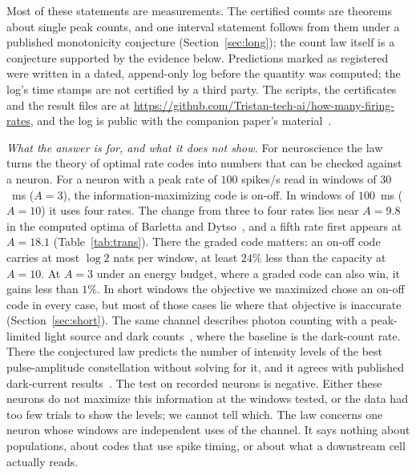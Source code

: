 \documentclass[journal]{IEEEtran}
\begin{document}
Most of these statements are measurements. The certified counts are theorems about single peak counts, and one
interval statement follows from them under a published monotonicity conjecture (Section~\ref{sec:long}); the count law itself is a
conjecture supported by the evidence below. Predictions marked as registered were written in a dated, append-only log before the
quantity was computed; the log's time stamps are not certified by a third party. The scripts, the
certificates and the result files are at \url{https://github.com/Tristan-tech-ai/how-many-firing-rates}, and the log is public with
the companion paper's material~\cite{Paper1}.

\emph{What the answer is for, and what it does not show.} For neuroscience the law turns the theory of optimal rate codes into
numbers that can be checked against a neuron. For a neuron with a peak rate of $100$ spikes/s read in windows of $30$~ms ($A = 3$),
the information-maximizing code is on-off. In windows of $100$~ms ($A = 10$) it uses four rates. The change from three to four
rates lies near $A = 9.8$ in the computed optima of Barletta and Dytso~\cite{BarlettaDytso2022}, and a fifth rate first appears at
$A = 18.1$ (Table~\ref{tab:trans}). There the graded code matters: an on-off code carries at most $\log 2$ nats per window, at least
$24\%$ less than the capacity at $A = 10$. At $A = 3$ under an energy budget, where a graded code can also win, it gains less than
$1\%$. In short windows the objective we maximized chose an on-off code in every case, but most of those cases lie where that
objective is inaccurate (Section~\ref{sec:short}). The same channel describes photon counting with a peak-limited light source and
dark counts~\cite{Shamai1990}, where the baseline is the dark-count rate. There the conjectured law predicts the number of intensity levels of
the best pulse-amplitude constellation without solving for it, and it agrees with published dark-current
results~\cite{BarlettaDytso2022}. The test on recorded neurons is negative. Either these neurons do not maximize this
information at the windows tested, or the data had too few trials to show the levels; we cannot tell which. The law concerns one neuron
whose windows are independent uses of the channel. It says nothing about populations, about codes that use spike timing, or about what
a downstream cell actually reads.
\end{document}
